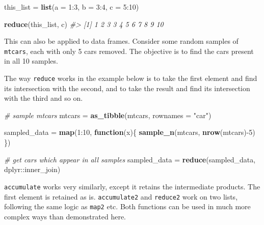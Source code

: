 \documentclass[]{book}
\newenvironment{Shaded}{}{}
\newcommand{\CommentTok}[1]{\textcolor[rgb]{0.38,0.63,0.69}{\textit{#1}}}
\newcommand{\ControlFlowTok}[1]{\textcolor[rgb]{0.00,0.44,0.13}{\textbf{#1}}}
\newcommand{\DataTypeTok}[1]{\textcolor[rgb]{0.56,0.13,0.00}{#1}}
\newcommand{\DecValTok}[1]{\textcolor[rgb]{0.25,0.63,0.44}{#1}}
\newcommand{\KeywordTok}[1]{\textcolor[rgb]{0.00,0.44,0.13}{\textbf{#1}}}
\newcommand{\NormalTok}[1]{#1}
\newcommand{\OperatorTok}[1]{\textcolor[rgb]{0.40,0.40,0.40}{#1}}
\newcommand{\StringTok}[1]{\textcolor[rgb]{0.25,0.44,0.63}{#1}}
\begin{document}
\begin{Shaded}
\begin{Highlighting}[]
\NormalTok{this_list =}\StringTok{ }\KeywordTok{list}\NormalTok{(}\DataTypeTok{a =} \DecValTok{1}\OperatorTok{:}\DecValTok{3}\NormalTok{, }\DataTypeTok{b =} \DecValTok{3}\OperatorTok{:}\DecValTok{4}\NormalTok{, }\DataTypeTok{c =} \DecValTok{5}\OperatorTok{:}\DecValTok{10}\NormalTok{)}

\KeywordTok{reduce}\NormalTok{(this_list, c)}
\CommentTok{#>  [1]  1  2  3  3  4  5  6  7  8  9 10}
\end{Highlighting}
\end{Shaded}

This can also be applied to data frames. Consider some random samples of \texttt{mtcars}, each with only 5 cars removed. The objective is to find the cars present in all 10 samples.

The way \texttt{reduce} works in the example below is to take the first element and find its intersection with the second, and to take the result and find its intersection with the third and so on.

\begin{Shaded}
\begin{Highlighting}[]
\CommentTok{# sample mtcars}
\NormalTok{mtcars =}\StringTok{ }\KeywordTok{as_tibble}\NormalTok{(mtcars, }\DataTypeTok{rownames =} \StringTok{"car"}\NormalTok{)}

\NormalTok{sampled_data =}\StringTok{ }\KeywordTok{map}\NormalTok{(}\DecValTok{1}\OperatorTok{:}\DecValTok{10}\NormalTok{, }\ControlFlowTok{function}\NormalTok{(x)\{}
  \KeywordTok{sample_n}\NormalTok{(mtcars, }\KeywordTok{nrow}\NormalTok{(mtcars)}\OperatorTok{-}\DecValTok{5}\NormalTok{)}
\NormalTok{  \})}

\CommentTok{# get cars which appear in all samples}
\NormalTok{sampled_data =}\StringTok{ }\KeywordTok{reduce}\NormalTok{(sampled_data, }
\NormalTok{                      dplyr}\OperatorTok{::}\NormalTok{inner_join)}
\end{Highlighting}
\end{Shaded}

\texttt{accumulate} works very similarly, except it retains the intermediate products. The first element is retained as is. \texttt{accumulate2} and \texttt{reduce2} work on two lists, following the same logic as \texttt{map2} etc.
Both functions can be used in much more complex ways than demonstrated here.
\end{document}
